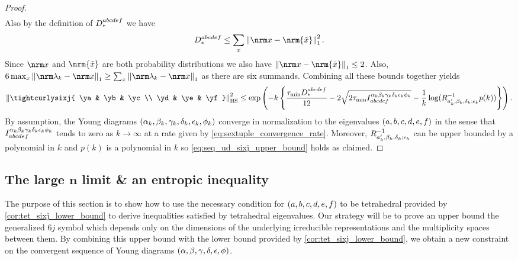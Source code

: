 \documentclass[notitlepage, 10pt]{article}
\begin{document}
\begin{proof}
\begin{align}
    \end{align}
    Also by the definition of $D_{*}^{abcdef}$ we have
    \begin{equation}
        D_{*}^{\ea\eb\ec\ed\ee\ef} \leq \sum_{\ex}\norm{\nrm \ex - \nrm {\tilde \ex}}_{1}^2.
    \end{equation}
    Since $\nrm \ex$ and $\nrm {\tilde \ex}$ are both probability distributions we also have $\norm{\nrm \ex - \nrm {\tilde \ex}}_{1} \leq 2$.
    Also, $6 \max_{\ex}\norm{\nrm \yx_k - \nrm \ex}_{1} \geq \sum_{\ex}\norm{\nrm \yx_k - \nrm \ex}_{1}$ as there are six summands.
    Combining all these bounds together yields
    \begin{equation}
        \norm{\tightcurlysixj{ \ya & \yb & \yc \\ \yd &  \ye &  \yf}}_{\mathrm{HS}}^2 
        \leq  \exp\left(-k\left\{\frac{\tau_{\min} D_{*}^{\ea\eb\ec\ed\ee\ef}}{12}
        -2\sqrt{2 \tau_{\min} I_{\ea\eb\ec\ed\ee\ef}^{\ya_k\yb_k\yc_k\yd_k\ye_k\yf_k}} - \frac{1}{k}\log(R_{\ea_k',\yb_k,\yd_k;\ye_k}^{-1} p(k))\right\}\right).
    \end{equation}
    By assumption, the Young diagrams $(\alpha_k, \beta_k, \gamma_k, \delta_k, \epsilon_k, \phi_k)$ converge in normalization to the eigenvalues $(a,b,c,d,e,f)$ in the sense that $I_{abcdef}^{\alpha_k\beta_k\gamma_k\delta_k\epsilon_k\phi_k}$ tends to zero as $k\to \infty$ at a rate given by \cref{eq:sextuple_convergence_rate}.
    Moreover, $R_{a_k',\beta_k,\delta_k;\epsilon_k}^{-1}$ can be upper bounded by a polynomial in $k$ and $p(k)$ is a polynomial in $k$ so \cref{eq:seq_ud_sixj_upper_bound} holds as claimed.
\end{proof}

\subsection{The large \texorpdfstring{$\boldsymbol{n}$}{n} limit \& an entropic inequality}
\label{sec:large_n}

The purpose of this section is to show how to use the necessary condition for $(a,b,c,d,e,f)$ to be tetrahedral provided by \cref{cor:tet_sixj_lower_bound} to derive inequalities satisfied by tetrahedral eigenvalues.
Our strategy will be to prove an upper bound the generalized $6j$ symbol which depends only on the dimensions of the underlying irreducible representations and the multiplicity spaces between them.
By combining this upper bound with the lower bound provided by \cref{cor:tet_sixj_lower_bound}, we obtain a new constraint on the convergent sequence of Young diagrams $(\alpha,\beta,\gamma,\delta,\epsilon,\phi)$.
\end{document}
